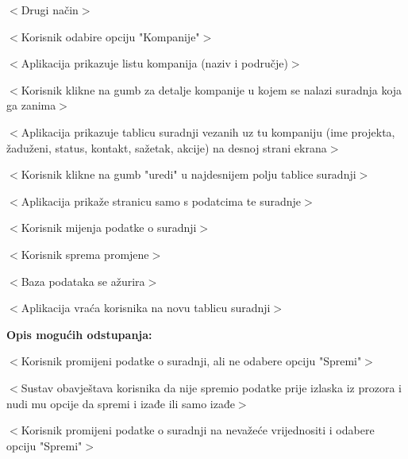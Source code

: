 \begin{packed_item}
\begin{packed_enum}
							\item $<$Drugi način$>$

							\item[] \begin{packed_item}

								\item $<$Korisnik odabire opciju "Kompanije"$>$
								\item $<$Aplikacija prikazuje listu kompanija (naziv i područje)$>$
								\item $<$Korisnik klikne na gumb za detalje kompanije u kojem se nalazi suradnja koja ga zanima$>$
								\item $<$Aplikacija prikazuje tablicu suradnji vezanih uz tu kompaniju (ime projekta,
								žaduženi, status, kontakt, sažetak, akcije) na desnoj strani ekrana$>$
								\item $<$Korisnik klikne na gumb "uredi" u najdesnijem polju tablice suradnji$>$
								\item $<$Aplikacija prikaže stranicu samo s podatcima te suradnje$>$
								\item $<$Korisnik mijenja podatke o suradnji$>$
								\item $<$Korisnik sprema promjene$>$
								\item $<$Baza podataka se ažurira$>$
								\item $<$Aplikacija vraća korisnika na novu tablicu suradnji$>$

							\end{packed_item}

							\item  \textbf{Opis mogućih odstupanja:}

							\item[] \begin{packed_item}

								\item[1.9.a, 2.7.a] $<$Korisnik promijeni podatke o suradnji,
								ali ne odabere opciju "Spremi"$>$
								\item[] \begin{packed_enum}

									\item $<$Sustav obavještava korisnika da nije spremio podatke prije izlaska
									iz prozora i nudi mu opcije da spremi i izađe ili samo izađe$>$

								\end{packed_enum}

								\item[1.9.b, 2.7.b] $<$Korisnik promijeni podatke o suradnji na nevažeće vrijednositi
								i odabere opciju "Spremi"$>$
								\item[] \begin{packed_enum}


\end{packed_enum}
\end{packed_item}
\end{packed_enum}
\end{packed_item}
